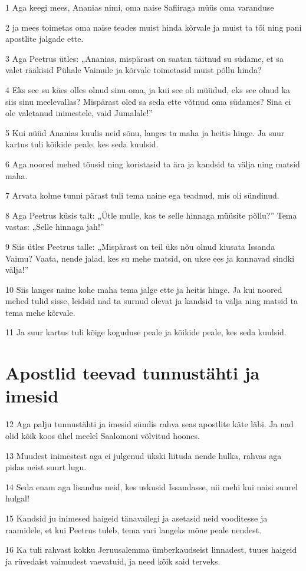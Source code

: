\par 1 Aga keegi mees, Ananias nimi, oma naise Safiiraga müüs oma varanduse
\par 2 ja mees toimetas oma naise teades muist hinda kõrvale ja muist ta tõi ning pani apostlite jalgade ette.
\par 3 Aga Peetrus ütles: „Ananias, mispärast on saatan täitnud su südame, et sa valet rääkisid Pühale Vaimule ja kõrvale toimetasid muist põllu hinda?
\par 4 Eks see su käes olles olnud sinu oma, ja kui see oli müüdud, eks see olnud ka siis sinu meelevallas? Mispärast oled sa seda ette võtnud oma südames? Sina ei ole valetanud inimestele, vaid Jumalale!”
\par 5 Kui nüüd Ananias kuulis neid sõnu, langes ta maha ja heitis hinge. Ja suur kartus tuli kõikide peale, kes seda kuulsid.
\par 6 Aga noored mehed tõusid ning koristasid ta ära ja kandsid ta välja ning matsid maha.
\par 7 Arvata kolme tunni pärast tuli tema naine ega teadnud, mis oli sündinud.
\par 8 Aga Peetrus küsis talt: „Ütle mulle, kas te selle hinnaga müüsite põllu?” Tema vastas: „Selle hinnaga jah!”
\par 9 Siis ütles Peetrus talle: „Mispärast on teil üks nõu olnud kiusata Issanda Vaimu? Vaata, nende jalad, kes su mehe matsid, on ukse ees ja kannavad sindki välja!”
\par 10 Siis langes naine kohe maha tema jalge ette ja heitis hinge. Ja kui noored mehed tulid sisse, leidsid nad ta surnud olevat ja kandsid ta välja ning matsid ta tema mehe kõrvale.
\par 11 Ja suur kartus tuli kõige koguduse peale ja kõikide peale, kes seda kuulsid.

\section*{Apostlid teevad tunnustähti ja imesid}

\par 12 Aga palju tunnustähti ja imesid sündis rahva seas apostlite käte läbi. Ja nad olid kõik koos ühel meelel Saalomoni võlvitud hoones.
\par 13 Muudest inimestest aga ei julgenud ükski liituda nende hulka, rahvas aga pidas neist suurt lugu.
\par 14 Seda enam aga lisandus neid, kes uskusid Issandasse, nii mehi kui naisi suurel hulgal!
\par 15 Kandsid ju inimesed haigeid tänavailegi ja asetasid neid vooditesse ja raamidele, et kui Peetrus tuleb, tema vari langeks mõne peale nendest.
\par 16 Ka tuli rahvast kokku Jeruusalemma ümberkaudseist linnadest, tuues haigeid ja rüvedaist vaimudest vaevatuid, ja need kõik said terveks.

